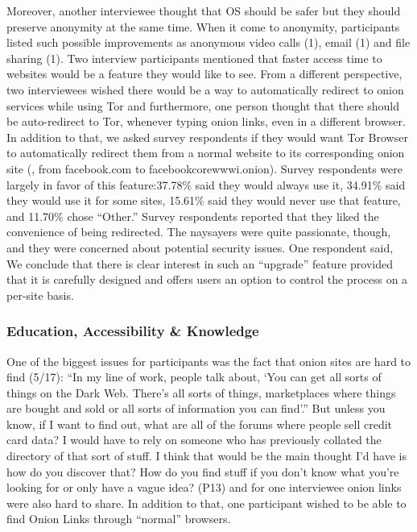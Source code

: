 Moreover, another interviewee thought that OS should be safer but they should
preserve anonymity at the same time. When it come to anonymity, participants
listed such possible improvements as anonymous video calls (1), email (1) and
file sharing (1). Two interview participants mentioned that faster access time
to websites would be a feature they would like to see. From a different
perspective, two interviewees wished there would be a way to automatically
redirect to onion services while using Tor and furthermore, one person thought
that there should be auto-redirect to Tor, whenever typing onion links, even in
a different browser. In addition to that, we asked survey respondents if they
would want Tor Browser to automatically redirect them from a normal website to
its corresponding onion site (\eg, from facebook.com to facebookcorewwwi.onion).
Survey respondents were largely in favor of this feature:37.78\% said they would
always use it, 34.91\% said they would use it for some sites, 15.61\% said they
would never use that feature,   and 11.70\% chose ``Other.'' Survey respondents
reported that they liked the convenience of being redirected.  The naysayers
were quite passionate, though, and they were concerned about potential security
issues. One respondent said,   We conclude that there is clear
interest in such an ``upgrade'' feature provided that it is carefully designed
and offers users an option to control the process on a per-site basis.

\subsubsection{Education, Accessibility \& Knowledge}

One of the biggest issues for participants was the fact that onion sites are
hard to find (5/17): ``In my line of work, people talk about, `You can get all
sorts of things on the Dark Web. There's all sorts of things, marketplaces where
things are bought and sold or all sorts of information you can find'.'' But
unless you know, if I want to find out, what are all of the forums where people
sell credit card data? I would have to rely on someone who has previously
collated the directory of that sort of stuff. I think that would be the main
thought I'd have is how do you discover that? How do you find stuff if you don't
know what you're looking for or only have a vague idea? (P13) and for one
interviewee onion links were also hard to share.  In addition to that, one
participant wished to be able to find Onion Links through ``normal'' browsers.

